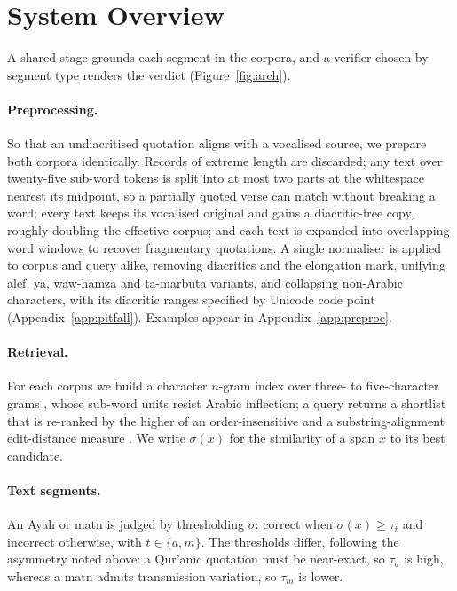 \documentclass[11pt]{article}
\begin{document}
\section{System Overview}
\label{sec:system}
A shared stage grounds each segment in the corpora, and a verifier chosen by segment type renders the
verdict (Figure~\ref{fig:arch}).

\paragraph{Preprocessing.} So that an undiacritised quotation aligns with a vocalised source, we
prepare both corpora identically. Records of extreme length are discarded; any text over twenty-five
sub-word tokens \citep{antoun2020arabert} is split into at most two parts at the whitespace nearest its midpoint, so a partially
quoted verse can match without breaking a word; every text keeps its vocalised original and gains a
diacritic-free copy, roughly doubling the effective corpus; and each text is expanded into overlapping
word windows to recover fragmentary quotations. A single normaliser is applied to corpus and query
alike, removing diacritics and the elongation mark, unifying alef, ya, waw-hamza and ta-marbuta
variants, and collapsing non-Arabic characters, with its diacritic ranges specified by Unicode code
point (Appendix~\ref{app:pitfall}). Examples appear in Appendix~\ref{app:preproc}.

\paragraph{Retrieval.} For each corpus we build a character $n$-gram index over three- to
five-character grams \citep{pedregosa2011scikit}, whose sub-word units resist Arabic inflection; a
query returns a shortlist that is re-ranked by the higher of an order-insensitive and a
substring-alignment edit-distance measure \citep{rapidfuzz}. We write $\sigma(x)$ for the similarity
of a span $x$ to its best candidate.

\paragraph{Text segments.} An Ayah or matn is judged by thresholding $\sigma$: correct when
$\sigma(x)\geq\tau_t$ and incorrect otherwise, with $t\in\{a,m\}$. The thresholds differ, following
the asymmetry noted above: a Qur'anic quotation must be near-exact, so $\tau_a$ is high, whereas a matn
admits transmission variation, so $\tau_m$ is lower.
\end{document}
